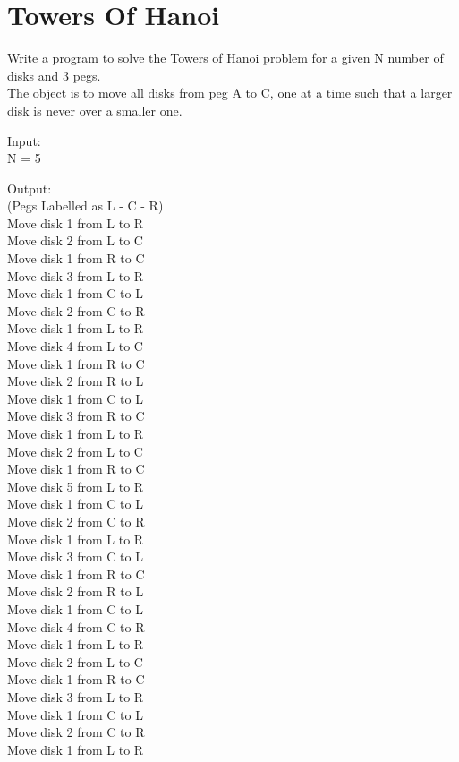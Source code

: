 \documentclass[ProgramminAssignment.tex]{subfiles}
\begin{document}
\section{Towers Of Hanoi}
Write a program to solve the Towers of Hanoi problem for a given N number of disks and 3 pegs.\\
The object is to move all disks from peg A to C, one at a time such that a larger disk is never over a smaller one.

Input:\\
N = 5

Output:\\
(Pegs Labelled as L - C - R)\\
Move disk 1 from L to R\\
Move disk 2 from L to C\\
Move disk 1 from R to C\\
Move disk 3 from L to R\\
Move disk 1 from C to L\\
Move disk 2 from C to R\\
Move disk 1 from L to R\\
Move disk 4 from L to C\\
Move disk 1 from R to C\\
Move disk 2 from R to L\\
Move disk 1 from C to L\\
Move disk 3 from R to C\\
Move disk 1 from L to R\\
Move disk 2 from L to C\\
Move disk 1 from R to C\\
Move disk 5 from L to R\\
Move disk 1 from C to L\\
Move disk 2 from C to R\\
Move disk 1 from L to R\\
Move disk 3 from C to L\\
Move disk 1 from R to C\\
Move disk 2 from R to L\\
Move disk 1 from C to L\\
Move disk 4 from C to R\\
Move disk 1 from L to R\\
Move disk 2 from L to C\\
Move disk 1 from R to C\\
Move disk 3 from L to R\\
Move disk 1 from C to L\\
Move disk 2 from C to R\\
Move disk 1 from L to R
\end{document}
